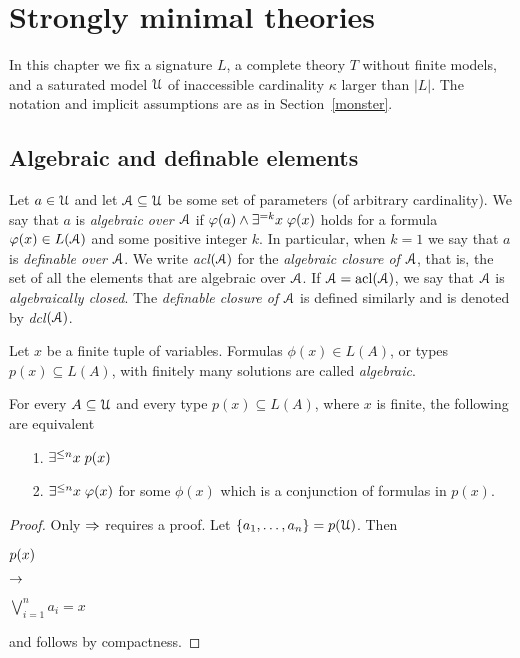 \chapter{Strongly minimal theories}\label{geometria}

\def\medrel#1{\parbox[t]{5ex}{$\displaystyle\hfil #1$}}
\def\ceq#1#2#3{\parbox{35ex}{$\displaystyle #1$}\medrel{#2}$\displaystyle  #3$}

In this chapter we fix a signature $L$, a complete theory $T$ without finite models, and a saturated model $\EuScript U$ of inaccessible cardinality $\kappa$ larger than $|L|$.
The notation and implicit assumptions are as in Section~\ref{monster}.

\section{Algebraic and definable elements}\label{acl}

Let $a\in\EuScript U$ and let $\EuScript A\subseteq\EuScript U$ be some set of parameters (of arbitrary cardinality).
We say that $a$ is \emph{algebraic over $\EuScript A$\/} if $\varphi(a)\wedge\exists^{=k}x\;\varphi(x)$ holds for a formula $\varphi(x)\in L(\EuScript A)$ and  some positive integer $k$.
In particular, when $k=1$ we say that $a$ is \emph{definable over $\EuScript A$}.
We write \emph{acl$(\EuScript A)$} for the \emph{algebraic closure of $\EuScript A$}, that is, the set of all the elements that are algebraic over $\EuScript A$.
If $\EuScript A={\rm acl}(\EuScript A)$, we say that $\EuScript A$ is \emph{algebraically closed}.
The \emph{definable closure of $\EuScript A$\/} is defined similarly and is denoted by \emph{dcl$(\EuScript A)$}.

Let $x$ be a finite tuple of variables.
Formulas $\phi(x)\in L(A)$, or types $p(x)\subseteq L(A)$, with finitely many solutions are called \emph{algebraic}.

\begin{proposition}\label{prop_tipialgebrici}
For every $A\subseteq\EuScript U$ and every type $p(x)\subseteq L(A)$, where $x$ is finite, the following are equivalent
\begin{itemize} 
\item[1.] $\exists^{\le n}x\; p(x)$
\item[2.] $\exists^{\le n}x\;\varphi(x)$ for some $\phi(x)$ which is a conjunction of formulas in $p(x)$.
\end{itemize}
\end{proposition}
\begin{proof} Only $\Rightarrow$ requires a proof.
Let $\{a_1,\dots,a_n\}=p(\EuScript U)$.
Then 

\ceq{\hfill p(x)}{\imp}{\bigvee^n_{i=1}a_i=x}

and  follows by compactness.
\end{proof}

